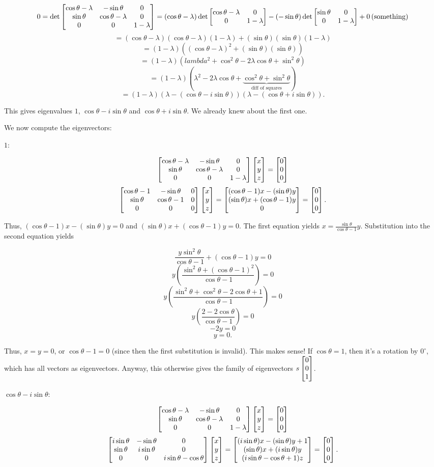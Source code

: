 \documentclass[../gatm_answers.tex]{subfiles}
\begin{document}
$$0=\det \begin{bmatrix} \cos\theta - \lambda & -\sin\theta & 0 \\ \sin\theta & \cos\theta- \lambda & 0 \\ 0 & 0 & 1- \lambda \end{bmatrix} = (\cos\theta- \lambda) \det \begin{bmatrix} \cos\theta- \lambda & 0 \\ 0 & 1- \lambda \end{bmatrix} - (-\sin\theta)\det \begin{bmatrix} \sin\theta & 0 \\ 0 & 1-\lambda \end{bmatrix} + 0\left(\text{something}\right)$$
$$=(\cos\theta-\lambda)(\cos\theta-\lambda)(1-\lambda) + (\sin\theta)(\sin\theta)(1-\lambda)$$
$$=(1-\lambda)((\cos\theta-\lambda)^2+(\sin\theta)(\sin\theta))$$
$$=(1-\lambda)(lambda^2 + \cos^2\theta - 2\lambda\cos\theta + \sin^2\theta)$$
$$=(1-\lambda)(\lambda^2-2\lambda\cos\theta+\underbrace{\cos^2\theta+\sin^2\theta}_{\text{diff of squares}})$$
$$=(1-\lambda)(\lambda-(\cos \theta - i\sin\theta))(\lambda - (\cos\theta + i\sin\theta)).$$

This gives eigenvalues $1$, $\cos \theta - i\sin\theta$ and $\cos\theta + i\sin\theta$. We already knew about the first one.

We now compute the eigenvectors:

$1$:

$$\begin{bmatrix} \cos\theta - \lambda & -\sin\theta & 0 \\ \sin\theta & \cos\theta- \lambda & 0 \\ 0 & 0 & 1- \lambda \end{bmatrix}\begin{bmatrix} x \\ y \\ z \end{bmatrix} = \begin{bmatrix} 0 \\ 0 \\ 0 \end{bmatrix}$$
$$\begin{bmatrix} \cos\theta - 1 & -\sin\theta & 0 \\ \sin\theta & \cos\theta- 1 & 0 \\ 0 & 0 & 0 \end{bmatrix}\begin{bmatrix} x \\ y \\ z \end{bmatrix} = \begin{bmatrix} (\cos\theta-1)x-(\sin\theta)y \\ (\sin\theta)x+(\cos\theta-1)y \\ 0 \end{bmatrix} = \begin{bmatrix} 0 \\ 0 \\ 0 \end{bmatrix}.$$

Thus, $(\cos\theta-1)x-(\sin\theta)y=0$ and $(\sin\theta)x + (\cos\theta-1)y=0$. The first equation yields $x=\frac{\sin\theta}{\cos\theta - 1}y$. Substitution into the second equation yields

$$\frac{y\sin^2\theta}{\cos\theta - 1} + (\cos\theta - 1)y = 0$$
$$y\left(\frac{\sin^2 \theta + (\cos\theta - 1)^2}{\cos\theta-1}\right) = 0$$
$$y\left(\frac{\sin^2 \theta + \cos^2\theta - 2\cos\theta + 1}{\cos\theta - 1}\right) = 0$$
$$y\left(\frac{2-2\cos\theta}{\cos\theta-1}\right)=0$$
$$-2y=0$$
$$y=0.$$

Thus, $x=y=0$, or $\cos\theta-1 = 0$ (since then the first substitution is invalid). This makes sense! If $\cos\theta=1$, then it's a rotation by $0^\circ$, which has all vectors as eigenvectors. Anyway, this otherwise gives the family of eigenvectors $s\begin{bmatrix} 0 \\ 0 \\ 1 \end{bmatrix}$.

$\cos\theta - i\sin\theta$:

$$\begin{bmatrix} \cos\theta - \lambda & -\sin\theta & 0 \\ \sin\theta & \cos\theta- \lambda & 0 \\ 0 & 0 & 1- \lambda \end{bmatrix}\begin{bmatrix} x \\ y \\ z \end{bmatrix} = \begin{bmatrix} 0 \\ 0 \\ 0 \end{bmatrix}$$
$$\begin{bmatrix} i\sin\theta & -\sin\theta & 0 \\ \sin\theta & i\sin\theta & 0 \\ 0 & 0 & i\sin\theta - \cos\theta \end{bmatrix}\begin{bmatrix} x \\ y \\ z \end{bmatrix}=\begin{bmatrix} (i\sin\theta)x-(\sin\theta)y+1 \\ (\sin\theta)x+(i\sin\theta)y \\ (i\sin\theta - \cos\theta+1)z \end{bmatrix} =\begin{bmatrix} 0 \\ 0 \\ 0 \end{bmatrix}.$$
\end{document}
